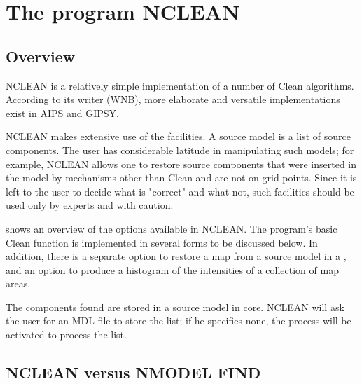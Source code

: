 %
%
%
%
\chapter{The program NCLEAN}

\tableofcontents

\section{ Overview}
\label{.overview}

	NCLEAN is a relatively simple implementation of a number of Clean
algorithms.  According to its writer (WNB), more elaborate and versatile
implementations exist in AIPS and GIPSY.

	NCLEAN makes extensive use of the
 facilities. A source model is a list
of source components.  The user has considerable latitude in manipulating such
models; for example, NCLEAN allows one to restore source components that were
inserted in the model by mechanisms other than Clean and are not on grid
points.  Since it is left to the user to decide what is "correct" and what not,
such facilities should be used only by experts and with caution.



	 shows an overview of the options available
in NCLEAN.  The program's basic Clean function is implemented in several forms
to be discussed below.  In addition, there is a separate option to restore a
map from a source model in a
, and an option to produce a histogram of
the intensities of a collection of map areas.

	The components found are stored in a source model in core. NCLEAN will
ask the user for an MDL file to store the list; if he specifies none, the
 process will be activated to process
the list.


\section{ NCLEAN versus NMODEL FIND}
\label{.nclean.versus}

